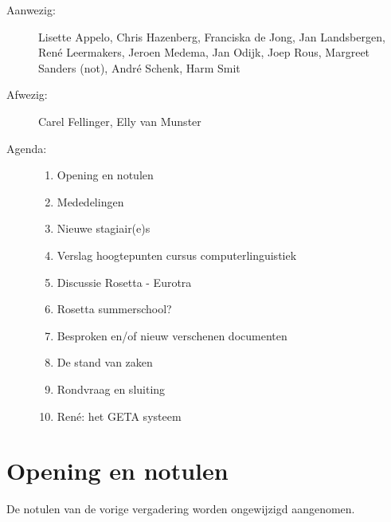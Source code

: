 

   \RosSupersedes{-}
   \MakeRosTitle
%
%
\begin{description}
\item[Aanwezig:] Lisette Appelo,
                 Chris Hazenberg, Franciska de Jong, 
                 Jan Landsbergen, Ren\'{e} Leermakers, 
                 Jeroen Medema,  
                 Jan Odijk, Joep Rous, Margreet Sanders (not),
                 Andr\'{e} Schenk, 
                 Harm Smit
\item[Afwezig:] Carel Fellinger, Elly van Munster
\item[Agenda:]\mbox{}
  \begin{enumerate}
  \item Opening en notulen
  \item Mededelingen
  \item Nieuwe stagiair(e)s
  \item Verslag hoogtepunten cursus computerlinguistiek
  \item Discussie Rosetta - Eurotra
  \item Rosetta summerschool?
  \item Besproken en/of nieuw verschenen documenten
  \item De stand van zaken
  \item Rondvraag en sluiting
  \item Ren\'{e}: het GETA systeem
  \end{enumerate}
\end{description}

\section{Opening en notulen}
De notulen van de vorige vergadering worden ongewijzigd 
aangenomen.

